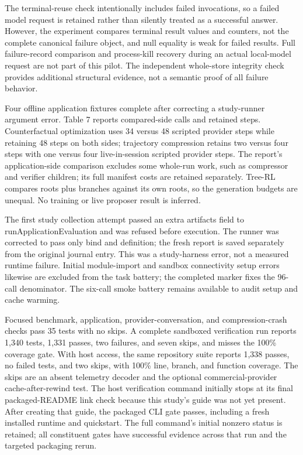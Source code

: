 \documentclass[11pt,a4paper]{article}
\begin{document}
The terminal-reuse check intentionally includes failed invocations, so a failed model request is retained rather than silently treated as a successful answer. However, the experiment compares terminal result values and counters, not the complete canonical failure object, and null equality is weak for failed results. Full failure-record comparison and process-kill recovery during an actual local-model request are not part of this pilot. The independent whole-store integrity check provides additional structural evidence, not a semantic proof of all failure behavior.


Four offline application fixtures complete after correcting a study-runner argument error. Table 7 reports compared-side calls and retained steps. Counterfactual optimization uses 34 versus 48 scripted provider steps while retaining 48 steps on both sides; trajectory compression retains two versus four steps with one versus four live-in-session scripted provider steps. The report's application-side comparison excludes some whole-run work, such as compressor and verifier children; its full manifest costs are retained separately. Tree-RL compares roots plus branches against its own roots, so the generation budgets are unequal. No training or live proposer result is inferred.


The first study collection attempt passed an extra artifacts field to runApplicationEvaluation and was refused before execution. The runner was corrected to pass only bind and definition; the fresh report is saved separately from the original journal entry. This was a study-harness error, not a measured runtime failure. Initial module-import and sandbox connectivity setup errors likewise are excluded from the task battery; the completed marker fixes the 96-call denominator. The six-call smoke battery remains available to audit setup and cache warming.


Focused benchmark, application, provider-conversation, and compression-crash checks pass 35 tests with no skips. A complete sandboxed verification run reports 1,340 tests, 1,331 passes, two failures, and seven skips, and misses the 100\% coverage gate. With host access, the same repository suite reports 1,338 passes, no failed tests, and two skips, with 100\% line, branch, and function coverage. The skips are an absent telemetry decoder and the optional commercial-provider cache-after-rewind test. The host verification command initially stops at its final packaged-README link check because this study's guide was not yet present. After creating that guide, the packaged CLI gate passes, including a fresh installed runtime and quickstart. The full command's initial nonzero status is retained; all constituent gates have successful evidence across that run and the targeted packaging rerun.
\end{document}
